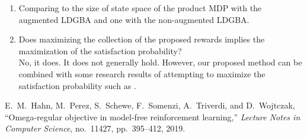 \documentclass[10 pt, dvipdfmx]{article}
\theoremstyle{definition}
\begin{document}
\begin{enumerate}
  \item Comparing to the size of state space of the product MDP with the augmented LDGBA and one with the non-augmented LDGBA. \\


  \item Does maximizing the collection of the proposed rewards implies the maximization of the satisfaction probability? \\
  No, it does. It does not generally hold. However, our proposed method can be combined with some research results of attempting to maximize the satisfaction probability such as \cite{Hahn2019}.
\end{enumerate}

\begin{thebibliography}{99}
E.\ M.\ Hahn, M.\ Perez, S.\ Schewe, F.\ Somenzi, A.\ Triverdi, and D.\ Wojtczak,
``Omega-regular objective in model-free reinforcement learning,''
\textit{Lecture Notes in Computer Science}, no.\ 11427, pp.\ 395--412, 2019.
\end{thebibliography}
\end{document}
